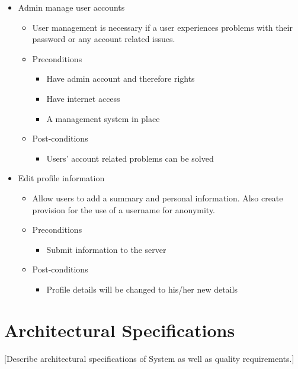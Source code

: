 \documentclass{article}
\begin{document}
\begin{itemize}
				\item Admin manage user accounts
				\begin{itemize}
					\item User management is necessary if a user experiences problems with their password or any account related issues.
					\item Preconditions
					\begin{itemize}
						\item Have admin account and therefore rights
						\item Have internet access
						\item A management system in place
					\end{itemize}
					\item Post-conditions
					\begin{itemize}
						\item Users’ account related problems can be solved
					\end{itemize}
                \end{itemize}
           
			
				\item Edit profile information
				\begin{itemize}
					\item Allow users to add a summary and personal information. Also create provision for the use of a username for anonymity.
					\item Preconditions
					\begin{itemize}
						\item Submit information to the server
					\end{itemize}
					\item Post-conditions
					\begin{itemize}
						\item Profile details will be changed to his/her new details
					\end{itemize}
					\end{itemize}
				\end{itemize}
           			
  \section{Architectural Specifications}
   [Describe architectural specifications of System as well as quality requirements.]
\end{document}
